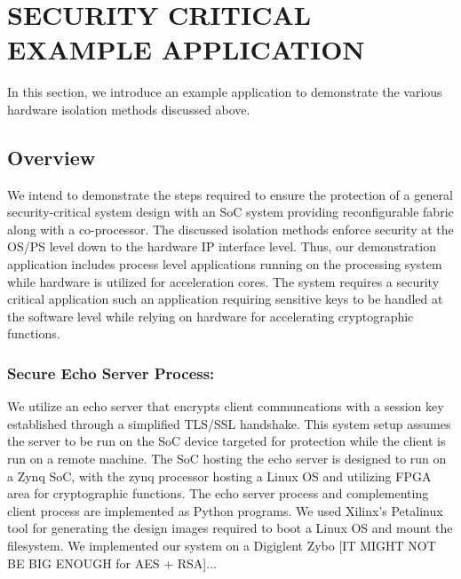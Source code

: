 \documentclass[sigconf]{acmart}
\theoremstyle{plain}
\theoremstyle{remark}
\begin{document}
\section{SECURITY CRITICAL EXAMPLE APPLICATION} \label{sec:application}

In this section, we introduce an example application to demonstrate the various hardware isolation methods discussed above.


%


\subsection{Overview}

We intend to demonstrate the steps required to ensure the protection of a general security-critical system design with an SoC system providing reconfigurable fabric along with a co-processor. The discussed isolation methods enforce security at the OS/PS level down to the hardware IP interface level. Thus, our demonstration application includes process level applications running on the processing system while hardware is utilized for acceleration cores. The system requires a security critical application such an application requiring sensitive keys to be handled at the software level while relying on hardware for accelerating cryptographic functions.

\subsubsection{Secure Echo Server Process:}
We utilize an echo server that encrypts client communcations with a session key established through a simplified TLS/SSL handshake. This system setup assumes the server to be run on the SoC device targeted for protection while the client is run on a remote machine. The SoC hosting the echo server is designed to run on a Zynq SoC, with the zynq processor hosting a Linux OS and utilizing FPGA area for cryptographic functions. The echo server process and complementing client process are implemented as Python programs. We used Xilinx's Petalinux tool for generating the design images required to boot a Linux OS and mount the filesystem. We implemented our system on a Digiglent Zybo [IT MIGHT NOT BE BIG ENOUGH for AES + RSA]...
\end{document}
